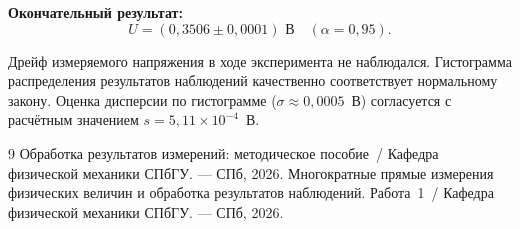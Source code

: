\documentclass[12pt,a4paper]{article}
\begin{document}
\medskip
\noindent\textbf{Окончательный результат:}
\[
  \boxed{U = (0{,}3506 \pm 0{,}0001) \text{ В} \quad (\alpha = 0{,}95).}
\]

Дрейф измеряемого напряжения в ходе эксперимента не наблюдался. Гистограмма
распределения результатов наблюдений качественно соответствует нормальному
закону. Оценка дисперсии по гистограмме ($\sigma \approx 0{,}0005$~В) согласуется
с расчётным значением $s = 5{,}11\times10^{-4}$~В.

\begin{thebibliography}{9}
  Обработка результатов измерений: методическое пособие~/ Кафедра физической
  механики СПбГУ. — СПб, 2026.
  Многократные прямые измерения физических величин и обработка результатов
  наблюдений. Работа~1~/ Кафедра физической механики СПбГУ. — СПб, 2026.
\end{thebibliography}
\end{document}
